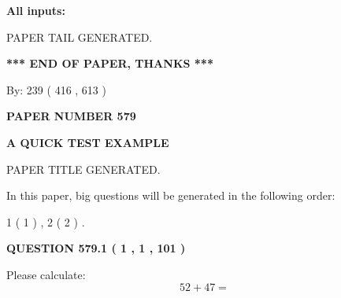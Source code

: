 \documentclass[12pt]{article}
\begin{document}
   
\noindent{}
   
   
   
   
\noindent\vspace{0.1in}\hspace{-0.08in} {\textbf{\Large{All inputs: }}}
   
   
   
   
   
   
 \vspace{0.2in}
 
   
   
\vspace{2.0in} PAPER TAIL GENERATED.
   
   
   
   
\vspace{1.0in} 
{\textbf{\large{ *** END OF PAPER, THANKS *** }}} 
   
   
\hspace{1.0in} By: 
 239 ( 416 ,  613 )
   
   
   
   
\newpage 
\setcounter{page}{ 
   579001 } 
   
   
   
   
 {\textbf{ \Large{ PAPER NUMBER  579  }}}
   
   
\vspace{0.2in}
   
   
   
   
   
   
   
   
 \vspace{0.2in}
{\LARGE {\textbf{ A QUICK TEST EXAMPLE}}}
   
   
 PAPER TITLE GENERATED.
   
   
   
\vspace{0.2in}
   
In this paper, big questions will be generated in the following order: 
   
   
   1 ( 1 )
 ,
   2 ( 2 )
 .
  
\vspace{0.2in}
  
{\textbf{\Large{QUESTION
579.1 
 ( 1 , 1 , 101 )
}}}
  
  
 
Please calculate:
\begin{equation}
52 +  %
47 = \nonumber
\end{equation}
 
\end{document}
